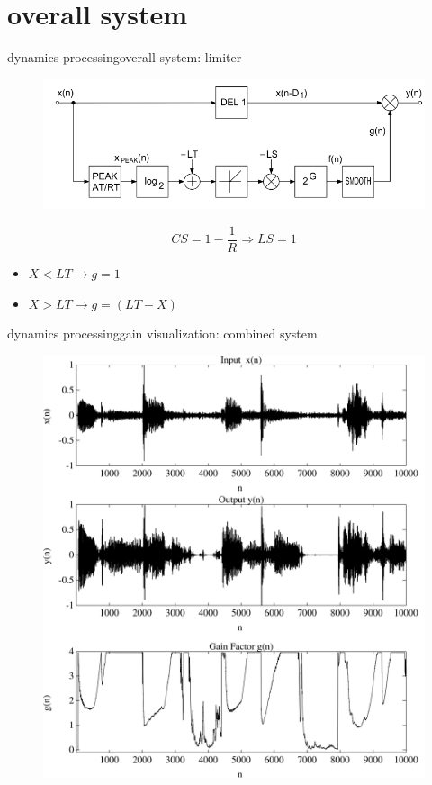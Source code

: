 \section{overall system}
\begin{frame}{dynamics processing}{overall system: limiter}
	\begin{figure}
		\centering
			\includegraphics[scale=.5]{graph/limiter}
	\end{figure}
	\begin{equation*}
		CS = 1-\frac{1}{R} \Rightarrow LS = 1
	\end{equation*}

	\pause	
	\begin{itemize}
		\item	$X<LT\rightarrow g = 1$
		\pause
		\item	$X>LT\rightarrow g = (LT-X)$
	\end{itemize}
\end{frame}

\begin{frame}{dynamics processing}{gain visualization: combined system}
	\vspace{-3mm}\begin{figure}
		\centering
			\includegraphics[scale=.25]{graph/dynamics_gain}
	\end{figure}
\end{frame}

